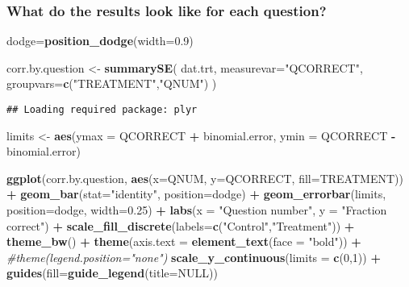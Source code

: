 \documentclass[]{article}
\newenvironment{Shaded}{\begin{snugshade}}{\end{snugshade}}
\newcommand{\KeywordTok}[1]{\textcolor[rgb]{0.13,0.29,0.53}{\textbf{#1}}}
\newcommand{\DataTypeTok}[1]{\textcolor[rgb]{0.13,0.29,0.53}{#1}}
\newcommand{\DecValTok}[1]{\textcolor[rgb]{0.00,0.00,0.81}{#1}}
\newcommand{\FloatTok}[1]{\textcolor[rgb]{0.00,0.00,0.81}{#1}}
\newcommand{\StringTok}[1]{\textcolor[rgb]{0.31,0.60,0.02}{#1}}
\newcommand{\CommentTok}[1]{\textcolor[rgb]{0.56,0.35,0.01}{\textit{#1}}}
\newcommand{\OtherTok}[1]{\textcolor[rgb]{0.56,0.35,0.01}{#1}}
\newcommand{\OperatorTok}[1]{\textcolor[rgb]{0.81,0.36,0.00}{\textbf{#1}}}
\newcommand{\NormalTok}[1]{#1}
\begin{document}
\subsubsection{What do the results look like for each
question?}\label{what-do-the-results-look-like-for-each-question}

\begin{Shaded}
\begin{Highlighting}[]
\NormalTok{dodge=}\KeywordTok{position_dodge}\NormalTok{(}\DataTypeTok{width=}\FloatTok{0.9}\NormalTok{)}

\NormalTok{corr.by.question <-}\StringTok{ }\KeywordTok{summarySE}\NormalTok{(}
\NormalTok{  dat.trt, }\DataTypeTok{measurevar=}\StringTok{"QCORRECT"}\NormalTok{, }\DataTypeTok{groupvars=}\KeywordTok{c}\NormalTok{(}\StringTok{"TREATMENT"}\NormalTok{,}\StringTok{"QNUM"}\NormalTok{)}
\NormalTok{  )}
\end{Highlighting}
\end{Shaded}

\begin{verbatim}
## Loading required package: plyr
\end{verbatim}

\begin{Shaded}
\begin{Highlighting}[]
\NormalTok{limits <-}\StringTok{ }\KeywordTok{aes}\NormalTok{(}\DataTypeTok{ymax =}\NormalTok{ QCORRECT }\OperatorTok{+}\StringTok{ }\NormalTok{binomial.error, }\DataTypeTok{ymin =}\NormalTok{ QCORRECT }\OperatorTok{-}\StringTok{ }\NormalTok{binomial.error)}

\KeywordTok{ggplot}\NormalTok{(corr.by.question, }\KeywordTok{aes}\NormalTok{(}\DataTypeTok{x=}\NormalTok{QNUM, }\DataTypeTok{y=}\NormalTok{QCORRECT, }\DataTypeTok{fill=}\NormalTok{TREATMENT)) }\OperatorTok{+}
\StringTok{  }\KeywordTok{geom_bar}\NormalTok{(}\DataTypeTok{stat=}\StringTok{"identity"}\NormalTok{, }\DataTypeTok{position=}\NormalTok{dodge) }\OperatorTok{+}\StringTok{ }
\StringTok{  }\KeywordTok{geom_errorbar}\NormalTok{(limits, }\DataTypeTok{position=}\NormalTok{dodge, }\DataTypeTok{width=}\FloatTok{0.25}\NormalTok{) }\OperatorTok{+}
\StringTok{  }\KeywordTok{labs}\NormalTok{(}\DataTypeTok{x =} \StringTok{"Question number"}\NormalTok{, }\DataTypeTok{y =} \StringTok{"Fraction correct"}\NormalTok{) }\OperatorTok{+}
\StringTok{  }\KeywordTok{scale_fill_discrete}\NormalTok{(}\DataTypeTok{labels=}\KeywordTok{c}\NormalTok{(}\StringTok{"Control"}\NormalTok{,}\StringTok{"Treatment"}\NormalTok{)) }\OperatorTok{+}
\StringTok{  }\KeywordTok{theme_bw}\NormalTok{() }\OperatorTok{+}\StringTok{ }
\StringTok{  }\KeywordTok{theme}\NormalTok{(}\DataTypeTok{axis.text =} \KeywordTok{element_text}\NormalTok{(}\DataTypeTok{face =} \StringTok{"bold"}\NormalTok{)) }\OperatorTok{+}\StringTok{ }
\StringTok{  }\CommentTok{#theme(legend.position="none")}
\StringTok{  }\KeywordTok{scale_y_continuous}\NormalTok{(}\DataTypeTok{limits =} \KeywordTok{c}\NormalTok{(}\DecValTok{0}\NormalTok{,}\DecValTok{1}\NormalTok{)) }\OperatorTok{+}
\StringTok{  }\KeywordTok{guides}\NormalTok{(}\DataTypeTok{fill=}\KeywordTok{guide_legend}\NormalTok{(}\DataTypeTok{title=}\OtherTok{NULL}\NormalTok{)) }
\end{Highlighting}
\end{Shaded}
\end{document}
